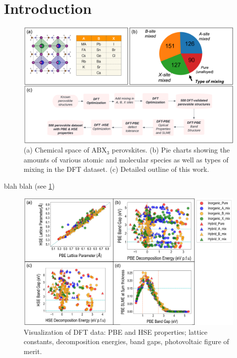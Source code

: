 \documentclass[twoside,twocolumn,9pt]{article}
\begin{document}
\section*{Introduction}

\begin{figure}[h]
  \centering
  \includegraphics[width=0.99\linewidth]{Figure1.png}
  \caption{\label{Fig:flowchart_and_exp_intro} 
    (a) Chemical space of ABX$_3$ perovskites. (b) Pie charts showing
    the amounts of various atomic and molecular species as well as types
    of mixing in the DFT dataset. (c) Detailed outline of this work.
  }
\end{figure}

blah blah (see \ref{Fig:flowchart_and_exp_intro})

\begin{figure}[h]
  \centering
  \includegraphics[width=0.99\linewidth]{Figure2.png}
  \caption{\label{Fig:outline} 
    Visualization of DFT data: PBE and HSE properties; lattice constants,
    decomposition energies, band gaps, photovoltaic figure of merit.
  }
\end{figure}
\end{document}
